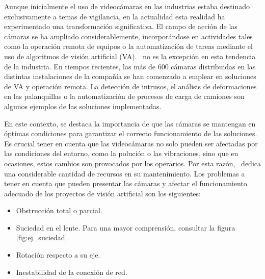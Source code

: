 \documentclass[
11pt, %
]{charter}
\begin{document}
Aunque inicialmente el uso de videocámaras en las industrias estaba destinado exclusivamente a temas de vigilancia, en la actualidad esta realidad ha experimentado una transformación significativa. El campo de acción de las cámaras se ha ampliado considerablemente, incorporándose en actividades tales como la operación remota de equipos o la automatización de tareas mediante el uso de algoritmos de visión artificial (VA). \empclientename\ no es la excepción en esta tendencia de la industria. En tiempos recientes, las más de 600 cámaras distribuidas en las distintas instalaciones de la compañía se han comenzado a emplear en soluciones de VA y operación remota. La detección de intrusos, el análisis de deformaciones en las palanquillas o la automatización de procesos de carga de camiones son algunos ejemplos de las soluciones implementadas.

En este contexto, se destaca la importancia de que las cámaras se mantengan en óptimas condiciones para garantizar el correcto funcionamiento de las soluciones. Es crucial tener en cuenta que las videocámaras no solo pueden ser afectadas por las condiciones del entorno, como la polución o las vibraciones, sino que en ocasiones, estos cambios son provocados por los operarios. Por esta razón, \empclientename\ dedica una considerable cantidad de recursos en su mantenimiento. Los problemas a tener en cuenta que pueden presentar las cámaras y afectar el funcionamiento adecuado de los proyectos de visión artificial son los siguientes:
\begin{itemize}
    \item Obstrucción total o parcial.
    \item Suciedad en el lente. Para una mayor comprensión, consultar la figura \ref{fig:ej_suciedad}.
    \item Rotación respecto a su eje. 
    \item Inestabilidad de la conexión de red.
\end{itemize}
\end{document}
